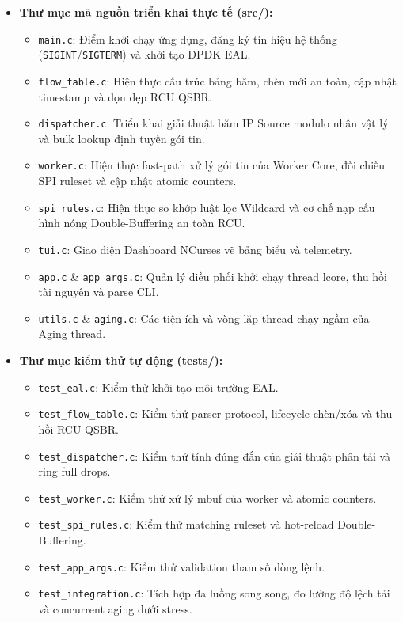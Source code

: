 \documentclass[12pt,a4paper,twoside]{report}
\begin{document}
\begin{flushleft}
\begin{itemize}
    \item \textbf{Thư mục mã nguồn triển khai thực tế (src/):}
    \begin{itemize}
        \item \texttt{main.c}: Điểm khởi chạy ứng dụng, đăng ký tín hiệu hệ thống (\texttt{SIGINT}/\allowbreak\texttt{SIGTERM}) và khởi tạo DPDK EAL.
        \item \texttt{flow\_}\allowbreak\texttt{table.c}: Hiện thực cấu trúc bảng băm, chèn mới an toàn, cập nhật timestamp và dọn dẹp RCU QSBR.
        \item \texttt{dispatcher.c}: Triển khai giải thuật băm IP Source modulo nhân vật lý và bulk lookup định tuyến gói tin.
        \item \texttt{worker.c}: Hiện thực fast-path xử lý gói tin của Worker Core, đối chiếu SPI ruleset và cập nhật atomic counters.
        \item \texttt{spi\_rules.c}: Hiện thực so khớp luật lọc Wildcard và cơ chế nạp cấu hình nóng Double-Buffering an toàn RCU.
        \item \texttt{tui.c}: Giao diện Dashboard NCurses vẽ bảng biểu và telemetry.
        \item \texttt{app.c} \& \texttt{app\_args.c}: Quản lý điều phối khởi chạy thread lcore, thu hồi tài nguyên và parse CLI.
        \item \texttt{utils.c} \& \texttt{aging.c}: Các tiện ích và vòng lặp thread chạy ngầm của Aging thread.
    \end{itemize}
    \item \textbf{Thư mục kiểm thử tự động (tests/):}
    \begin{itemize}
        \item \texttt{test\_eal.c}: Kiểm thử khởi tạo môi trường EAL.
        \item \texttt{test\_flow\_table.c}: Kiểm thử parser protocol, lifecycle chèn/xóa và thu hồi RCU QSBR.
        \item \texttt{test\_dispatcher.c}: Kiểm thử tính đúng đắn của giải thuật phân tải và ring full drops.
        \item \texttt{test\_worker.c}: Kiểm thử xử lý mbuf của worker và atomic counters.
        \item \texttt{test\_spi\_rules.c}: Kiểm thử matching ruleset và hot-reload Double-Buffering.
        \item \texttt{test\_}\allowbreak\texttt{app\_}\allowbreak\texttt{args.c}: Kiểm thử validation tham số dòng lệnh.
        \item \texttt{test\_integration.c}: Tích hợp đa luồng song song, đo lường độ lệch tải và concurrent aging dưới stress.
    \end{itemize}
\end{itemize}
\end{flushleft}
\end{document}
